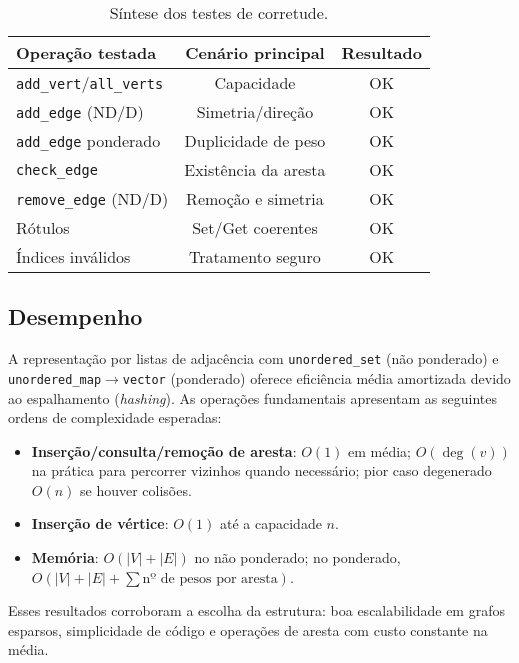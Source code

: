 \documentclass{sbc2023}%
\begin{document}
\begin{table}[!ht]
\centering
\caption{Síntese dos testes de corretude.}
\begin{tabular}{@{}lcc@{}}
\toprule
\textbf{Operação testada} & \textbf{Cenário principal} & \textbf{Resultado} \\
\midrule
\texttt{add\_vert}/\texttt{all\_verts} & Capacidade & OK \\
\texttt{add\_edge} (ND/D)              & Simetria/direção & OK \\
\texttt{add\_edge} ponderado           & Duplicidade de peso & OK \\
\texttt{check\_edge}                   & Existência da aresta & OK \\
\texttt{remove\_edge} (ND/D)           & Remoção e simetria & OK \\
Rótulos                                & Set/Get coerentes & OK \\
Índices inválidos                      & Tratamento seguro & OK \\
\bottomrule
\end{tabular}
\label{tab:corretude}
\end{table}

\subsection{Desempenho}
A representação por listas de adjacência com \texttt{unordered\_set}
(não ponderado) e \texttt{unordered\_map}$\to$\texttt{vector}
(ponderado) oferece eficiência média amortizada devido ao espalhamento
(\textit{hashing}). As operações fundamentais apresentam as seguintes
ordens de complexidade esperadas:

\begin{itemize}
  \item \textbf{Inserção/consulta/remoção de aresta}:
        \(O(1)\) em média; \(O(\deg(v))\) na prática para percorrer vizinhos
        quando necessário; pior caso degenerado \(O(n)\) se houver colisões.
  \item \textbf{Inserção de vértice}: \(O(1)\) até a capacidade \(n\).
  \item \textbf{Memória}: \(O(|V| + |E|)\) no não ponderado; no ponderado,
        \(O(|V| + |E| + \sum \text{nº de pesos por aresta})\).
\end{itemize}

Esses resultados corroboram a escolha da estrutura: boa escalabilidade em
grafos esparsos, simplicidade de código e operações de aresta com custo
constante na média. 
\end{document}
